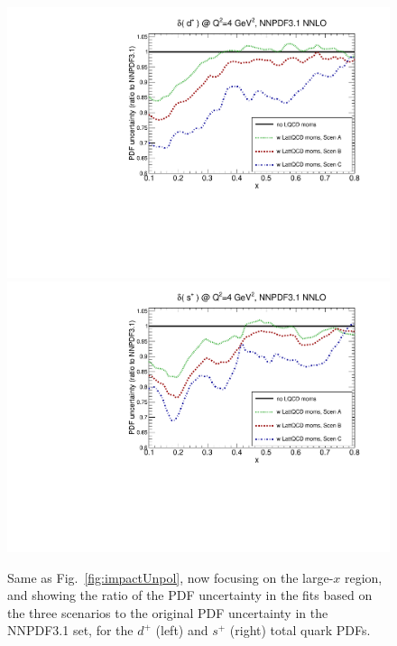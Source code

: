 \begin{figure}[!t]
\centering
\includegraphics[scale=0.45]{plots/xdp-unpol-lattice-relerr-largex.pdf}
\includegraphics[scale=0.45]{plots/xsp-unpol-lattice-relerr-largex.pdf}
\caption{\small Same as Fig.~\ref{fig:impactUnpol}, now focusing
  on the large-$x$ region, and showing the ratio of the
  PDF uncertainty in the fits based on the three scenarios
  to the original
  PDF uncertainty in the NNPDF3.1 set, for the $d^+$ (left)
  and $s^+$ (right) total quark PDFs.
}    
\label{fig:impactUnpollargex}
\end{figure}

